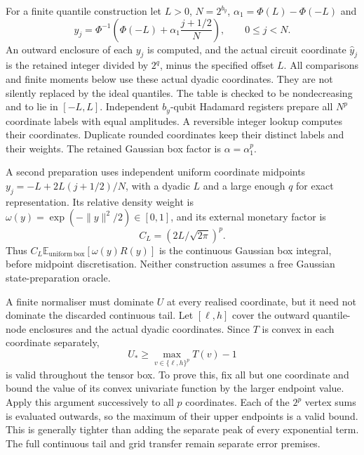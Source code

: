 For a finite quantile construction let $L>0$, $N=2^{b_y}$,
$\alpha_1=\Phi(L)-\Phi(-L)$ and
\begin{equation}
 y_j=\Phi^{-1}\!\left(\Phi(-L)+\alpha_1\frac{j+1/2}{N}\right),
 \qquad 0\leq j<N.
 \label{eq:iv-quantile}
\end{equation}
An outward enclosure of each $y_j$ is computed, and the actual circuit
coordinate $\widehat y_j$ is the retained integer divided by $2^q$, minus the
specified offset $L$.  All comparisons and finite moments below use these
actual dyadic coordinates.  They are not silently replaced by the ideal
quantiles.  The table is checked to be nondecreasing and to lie in $[-L,L]$.
Independent $b_y$-qubit Hadamard registers prepare all $N^p$ coordinate labels
with equal amplitudes.  A reversible integer lookup computes their coordinates.
Duplicate rounded coordinates keep their distinct labels and their weights.
The retained Gaussian box factor is $\alpha=\alpha_1^p$.

A second preparation uses independent uniform coordinate midpoints
$y_j=-L+2L(j+1/2)/N$, with a dyadic $L$ and a large enough $q$ for exact
representation.  Its relative density weight is
$\omega(y)=\exp(-\|y\|^2/2)\in[0,1]$, and its external monetary factor is
\begin{equation}
 C_L=(2L/\sqrt{2\pi})^p.
 \label{eq:iv-box-factor}
\end{equation}
Thus $C_L\mathbb E_{\mathrm{uniform\ box}}[\omega(y)R(y)]$ is the
continuous Gaussian box integral, before midpoint discretisation.
Neither construction assumes a free Gaussian state-preparation oracle.

A finite normaliser must dominate $U$ at every realised coordinate, but it
need not dominate the discarded continuous tail.  Let $[\ell,h]$ cover the
outward quantile-node enclosures and the actual dyadic coordinates.  Since
$T$ is convex in each coordinate separately,
\begin{equation}
 U_*\geq\max_{v\in\{\ell,h\}^p}T(v)-1
 \label{eq:iv-vertex}
\end{equation}
is valid throughout the tensor box.  To prove this, fix all but one
coordinate and bound the value of its convex univariate function by the
larger endpoint value.  Apply this argument successively to all $p$
coordinates.  Each of the $2^p$ vertex sums is evaluated outwards, so the
maximum of their upper endpoints is a valid bound.  This is generally tighter
than adding the separate peak of every exponential term.  The full
continuous tail and grid transfer remain separate error premises.

